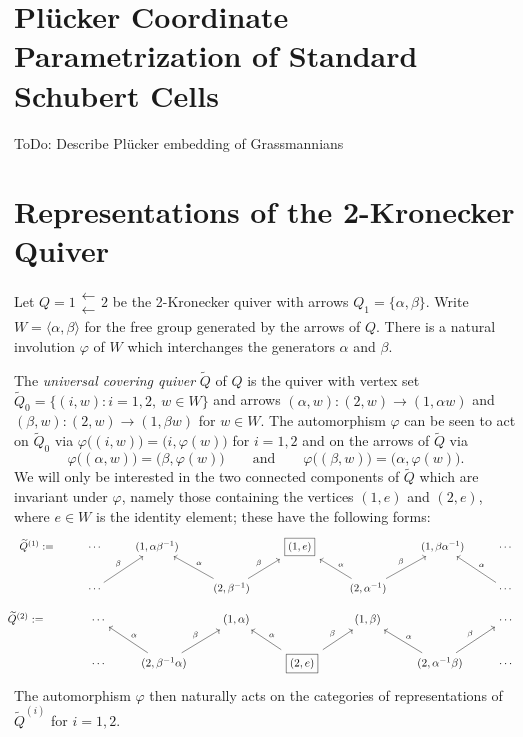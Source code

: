 \documentclass{amsart}
\numberwithin{equation}{section}
\begin{document}
  \section{Pl\"ucker Coordinate Parametrization of Standard Schubert Cells}
  ToDo: Describe Pl\"ucker embedding of Grassmannians

  \section{Representations of the 2-Kronecker Quiver}

  Let $Q=1\substack{\longleftarrow\\\longleftarrow} 2$ be the 2-Kronecker quiver with arrows $Q_1=\{\alpha,\beta\}$.
  Write $W=\langle\alpha,\beta\rangle$ for the free group generated by the arrows of $Q$.
  There is a natural involution $\varphi$ of $W$ which interchanges the generators $\alpha$ and $\beta$.

  The \emph{universal covering quiver} $\widetilde Q$ of $Q$ is the quiver with vertex set $\widetilde Q_0=\{(i,w):i=1,2,\ w\in W\}$ and arrows $(\alpha,w):(2,w)\to(1,\alpha w)$ and $(\beta,w):(2,w)\to(1,\beta w)$ for $w\in W$.
  The automorphism $\varphi$ can be seen to act on $\widetilde Q_0$ via $\varphi\big((i,w)\big)=\big(i,\varphi(w)\big)$ for $i=1,2$ and on the arrows of $\widetilde Q$ via
  \[\varphi\big((\alpha,w)\big)=\big(\beta,\varphi(w)\big) \qquad \text{and} \qquad \varphi\big((\beta,w)\big)=\big(\alpha,\varphi(w)\big).\]
  We will only be interested in the two connected components of $\widetilde Q$ which are invariant under $\varphi$, namely those containing the vertices $(1,e)$ and $(2,e)$, where $e\in W$ is the identity element; these have the following forms:
  \[
    \begin{tikzcd}
      \widetilde Q^{(1)} := & \cdots & (1,\alpha\beta^{-1}) & & \fbox{$(1,e)$} & & (1,\beta\alpha^{-1}) & \cdots \\
      & \cdots \arrow["\beta"]{ur} & & (2,\beta^{-1}) \arrow["\alpha"']{ul} \arrow["\beta"]{ur} & & (2,\alpha^{-1}) \arrow["\alpha"']{ul} \arrow["\beta"]{ur} & & \cdots \arrow["\alpha"']{ul}
    \end{tikzcd}
  \]
  \[
    \begin{tikzcd}
      \hspace{-0.37cm} \widetilde Q^{(2)} := \hspace{0.37cm} & \cdots & & (1,\alpha) & & (1,\beta) & & \cdots \\
      & \cdots & (2,\beta^{-1}\alpha) \arrow["\alpha"']{ul} \arrow["\beta"]{ur} & & \fbox{$(2,e)$} \arrow["\alpha"']{ul} \arrow["\beta"]{ur} & & (2,\alpha^{-1}\beta) \arrow["\alpha"']{ul} \arrow["\beta"]{ur} & \cdots
    \end{tikzcd}
  \]
  The automorphism $\varphi$ then naturally acts on the categories of representations of $\widetilde Q^{(i)}$ for $i=1,2$.
\end{document}
